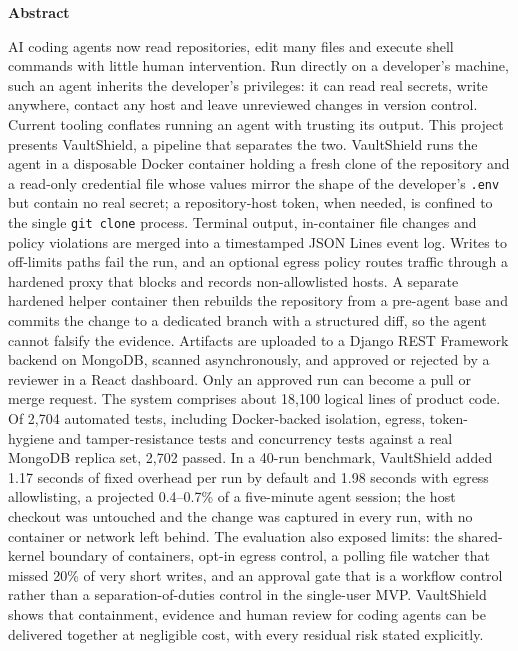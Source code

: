 \documentclass[12pt,a4paper,oneside]{report}
\begin{document}
\thispagestyle{empty}
\vspace*{1.60in}
\begin{center}{\large\bfseries Abstract}\end{center}
\vspace{0.20in}
AI coding agents now read repositories, edit many files and execute shell commands with little human intervention. Run directly on a developer's machine, such an agent inherits the developer's privileges: it can read real secrets, write anywhere, contact any host and leave unreviewed changes in version control. Current tooling conflates running an agent with trusting its output. This project presents VaultShield, a pipeline that separates the two. VaultShield runs the agent in a disposable Docker container holding a fresh clone of the repository and a read-only credential file whose values mirror the shape of the developer's \texttt{.env} but contain no real secret; a repository-host token, when needed, is confined to the single \texttt{git clone} process. Terminal output, in-container file changes and policy violations are merged into a timestamped JSON Lines event log. Writes to off-limits paths fail the run, and an optional egress policy routes traffic through a hardened proxy that blocks and records non-allowlisted hosts. A separate hardened helper container then rebuilds the repository from a pre-agent base and commits the change to a dedicated branch with a structured diff, so the agent cannot falsify the evidence. Artifacts are uploaded to a Django REST Framework backend on MongoDB, scanned asynchronously, and approved or rejected by a reviewer in a React dashboard. Only an approved run can become a pull or merge request. The system comprises about 18,100 logical lines of product code. Of 2,704 automated tests, including Docker-backed isolation, egress, token-hygiene and tamper-resistance tests and concurrency tests against a real MongoDB replica set, 2,702 passed. In a 40-run benchmark, VaultShield added 1.17 seconds of fixed overhead per run by default and 1.98 seconds with egress allowlisting, a projected 0.4--0.7\% of a five-minute agent session; the host checkout was untouched and the change was captured in every run, with no container or network left behind. The evaluation also exposed limits: the shared-kernel boundary of containers, opt-in egress control, a polling file watcher that missed 20\% of very short writes, and an approval gate that is a workflow control rather than a separation-of-duties control in the single-user MVP. VaultShield shows that containment, evidence and human review for coding agents can be delivered together at negligible cost, with every residual risk stated explicitly.
\end{document}
